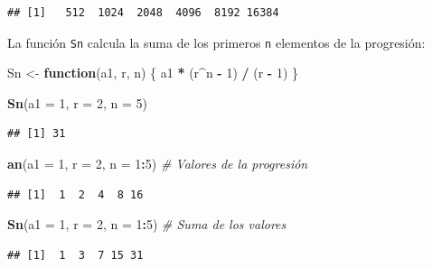 \documentclass[]{book}
\newenvironment{Shaded}{\begin{snugshade}}{\end{snugshade}}
\newcommand{\KeywordTok}[1]{\textcolor[rgb]{0.13,0.29,0.53}{\textbf{#1}}}
\newcommand{\DataTypeTok}[1]{\textcolor[rgb]{0.13,0.29,0.53}{#1}}
\newcommand{\DecValTok}[1]{\textcolor[rgb]{0.00,0.00,0.81}{#1}}
\newcommand{\StringTok}[1]{\textcolor[rgb]{0.31,0.60,0.02}{#1}}
\newcommand{\CommentTok}[1]{\textcolor[rgb]{0.56,0.35,0.01}{\textit{#1}}}
\newcommand{\ControlFlowTok}[1]{\textcolor[rgb]{0.13,0.29,0.53}{\textbf{#1}}}
\newcommand{\OperatorTok}[1]{\textcolor[rgb]{0.81,0.36,0.00}{\textbf{#1}}}
\newcommand{\NormalTok}[1]{#1}
\begin{document}
\begin{verbatim}
## [1]   512  1024  2048  4096  8192 16384
\end{verbatim}

La función \texttt{Sn} calcula la suma de los primeros \texttt{n}
elementos de la progresión:

\begin{Shaded}
\begin{Highlighting}[]
\NormalTok{Sn <-}\StringTok{ }\ControlFlowTok{function}\NormalTok{(a1, r, n) \{}
\NormalTok{        a1 }\OperatorTok{*}\StringTok{ }\NormalTok{(r}\OperatorTok{^}\NormalTok{n }\OperatorTok{-}\StringTok{ }\DecValTok{1}\NormalTok{) }\OperatorTok{/}\StringTok{ }\NormalTok{(r }\OperatorTok{-}\StringTok{ }\DecValTok{1}\NormalTok{)}
\NormalTok{      \}}
  
\KeywordTok{Sn}\NormalTok{(}\DataTypeTok{a1 =} \DecValTok{1}\NormalTok{, }\DataTypeTok{r =} \DecValTok{2}\NormalTok{, }\DataTypeTok{n =} \DecValTok{5}\NormalTok{)}
\end{Highlighting}
\end{Shaded}

\begin{verbatim}
## [1] 31
\end{verbatim}

\begin{Shaded}
\begin{Highlighting}[]
\KeywordTok{an}\NormalTok{(}\DataTypeTok{a1 =} \DecValTok{1}\NormalTok{, }\DataTypeTok{r =} \DecValTok{2}\NormalTok{, }\DataTypeTok{n =} \DecValTok{1}\OperatorTok{:}\DecValTok{5}\NormalTok{)    }\CommentTok{# Valores de la progresión}
\end{Highlighting}
\end{Shaded}

\begin{verbatim}
## [1]  1  2  4  8 16
\end{verbatim}

\begin{Shaded}
\begin{Highlighting}[]
\KeywordTok{Sn}\NormalTok{(}\DataTypeTok{a1 =} \DecValTok{1}\NormalTok{, }\DataTypeTok{r =} \DecValTok{2}\NormalTok{, }\DataTypeTok{n =} \DecValTok{1}\OperatorTok{:}\DecValTok{5}\NormalTok{)    }\CommentTok{# Suma de los valores}
\end{Highlighting}
\end{Shaded}

\begin{verbatim}
## [1]  1  3  7 15 31
\end{verbatim}
\end{document}
